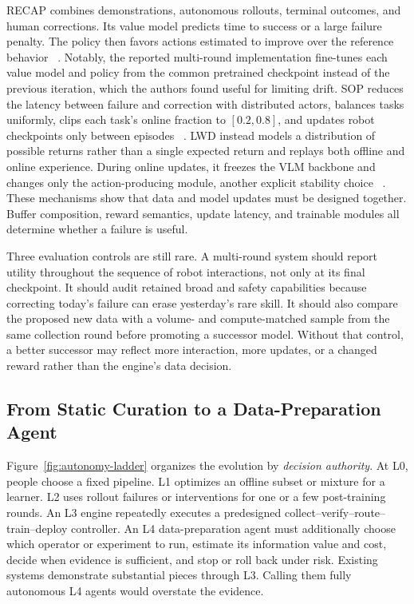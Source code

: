 RECAP combines demonstrations, autonomous rollouts, terminal outcomes, and human corrections.
Its value model predicts time to success or a large failure penalty.
The policy then favors actions estimated to improve over the reference behavior ~\cite{intelligence20250_2511_14759}.
Notably, the reported multi-round implementation fine-tunes each value model and policy from the common pretrained checkpoint instead of the previous iteration, which the authors found useful for limiting drift.
SOP reduces the latency between failure and correction with distributed actors, balances tasks uniformly, clips each task's online fraction to $[0.2,0.8]$, and updates robot checkpoints only between episodes ~\cite{pan2026sop_2601_03044}.
LWD instead models a distribution of possible returns rather than a single expected return and replays both offline and online experience.
During online updates, it freezes the VLM backbone and changes only the action-producing module, another explicit stability choice ~\cite{wang2026learning_2605_00416}.
These mechanisms show that data and model updates must be designed together.
Buffer composition, reward semantics, update latency, and trainable modules all determine whether a failure is useful.

Three evaluation controls are still rare.
A multi-round system should report utility throughout the sequence of robot interactions, not only at its final checkpoint.
It should audit retained broad and safety capabilities because correcting today's failure can erase yesterday's rare skill.
It should also compare the proposed new data with a volume- and compute-matched sample from the same collection round before promoting a successor model.
Without that control, a better successor may reflect more interaction, more updates, or a changed reward rather than the engine's data decision.

\subsection{From Static Curation to a Data-Preparation Agent}

Figure~\ref{fig:autonomy-ladder} organizes the evolution by \emph{decision authority}.
At L0, people choose a fixed pipeline.
L1 optimizes an offline subset or mixture for a learner.
L2 uses rollout failures or interventions for one or a few post-training rounds.
An L3 engine repeatedly executes a predesigned collect--verify--route--train--deploy controller.
An L4 data-preparation agent must additionally choose which operator or experiment to run, estimate its information value and cost, decide when evidence is sufficient, and stop or roll back under risk.
Existing systems demonstrate substantial pieces through L3.
Calling them fully autonomous L4 agents would overstate the evidence.

